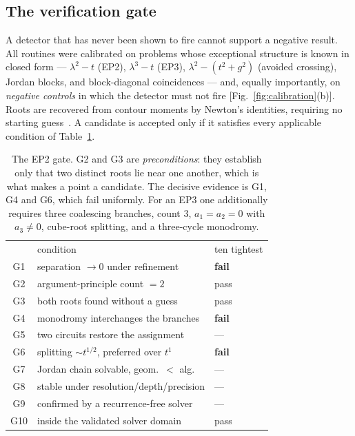 \documentclass[aps,prd,reprint,superscriptaddress,nofootinbib,longbibliography]{revtex4-2}
\theoremstyle{plain}
\theoremstyle{definition}
\theoremstyle{remark}
\begin{document}
\subsection{The verification gate}\label{sec:local:gate}

A detector that has never been shown to fire cannot support a negative result.
All routines were calibrated on problems whose exceptional structure is known in
closed form --- $\lambda^2-t$ (EP2), $\lambda^3-t$ (EP3),
$\lambda^2-(t^2+g^2)$ (avoided crossing), Jordan blocks, and block-diagonal
coincidences --- and, equally importantly, on \emph{negative controls} in which
the detector must not fire [Fig.~\ref{fig:calibration}(b)]. Roots are recovered
from contour moments by Newton's identities, requiring no starting
guess~\cite{KravanjaVanBarel2000}. A candidate is accepted only if it satisfies
every applicable condition of Table~\ref{tab:gate}.

\begin{table}[t]
\centering
\begin{ruledtabular}
\begin{tabular}{cll}
& condition & ten tightest \\
\colrule
G1 & separation $\to0$ under refinement & \textbf{fail} \\
G2 & argument-principle count $=2$ & pass \\
G3 & both roots found without a guess & pass \\
G4 & monodromy interchanges the branches & \textbf{fail} \\
G5 & two circuits restore the assignment & --- \\
G6 & splitting $\sim t^{1/2}$, preferred over $t^1$ & \textbf{fail} \\
G7 & Jordan chain solvable, geom.\ $<$ alg. & --- \\
G8 & stable under resolution/depth/precision & --- \\
G9 & confirmed by a recurrence-free solver & --- \\
G10 & inside the validated solver domain & pass \\
\end{tabular}
\end{ruledtabular}
\caption{The EP2 gate. G2 and G3 are \emph{preconditions}: they establish only
that two distinct roots lie near one another, which is what makes a point a
candidate. The decisive evidence is G1, G4 and G6, which fail uniformly. For an
EP3 one additionally requires three coalescing branches, count $3$,
$a_1=a_2=0$ with $a_3\ne0$, cube-root splitting, and a three-cycle monodromy.}
\label{tab:gate}
\end{table}
\end{document}
